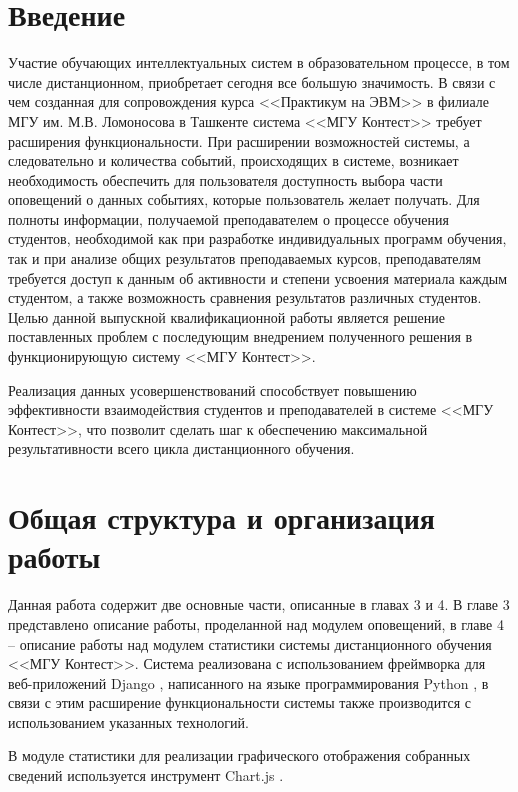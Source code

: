 \documentclass[12pt, a4paper, oneside]{article}
\begin{document}
\section{Введение}
Участие обучающих интеллектуальных систем в образовательном процессе, в том числе дистанционном, приобретает сегодня все большую значимость. В связи с чем созданная для сопровождения курса <<Практикум на ЭВМ>> в филиале МГУ им. М.В. Ломоносова в Ташкенте система <<МГУ Контест>> требует расширения функциональности. При расширении возможностей системы, а следовательно и количества событий, происходящих в системе, возникает необходимость обеспечить для пользователя доступность выбора части оповещений о данных событиях, которые пользователь желает получать. Для полноты информации, получаемой преподавателем о процессе обучения студентов, необходимой как при разработке индивидуальных программ обучения, так и при анализе общих результатов преподаваемых курсов, преподавателям требуется доступ к данным об активности и степени усвоения материала каждым студентом, а также возможность сравнения результатов различных студентов. Целью данной выпускной квалификационной работы является решение поставленных проблем с последующим внедрением полученного решения в функционирующую систему <<МГУ Контест>>.

Реализация данных усовершенствований способствует повышению эффективности взаимодействия студентов и преподавателей в системе <<МГУ Контест>>, что позволит сделать шаг к обеспечению максимальной результативности всего цикла дистанционного обучения.
\newpage

\section{Общая структура и организация работы}
Данная работа содержит две основные части, описанные в главах 3 и 4. В главе 3 представлено описание работы, проделанной над модулем оповещений, в главе 4 – описание работы над модулем статистики системы дистанционного обучения <<МГУ Контест>>. Система реализована с использованием фреймворка для веб-приложений Django \cite{django}, написанного на языке программирования Python \cite{python}, в связи с этим расширение функциональности системы также производится с использованием указанных технологий.

В модуле статистики для реализации графического отображения собранных сведений используется инструмент Chart.js \cite{chartjs}.
\newpage
\end{document}
